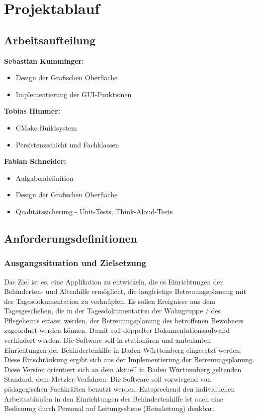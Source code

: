 \section{Projektablauf}

\subsection{Arbeitsaufteilung}
\textbf{Sebastian Kumminger:}
\begin{itemize}
	\item Design der Grafischen Oberfläche
	\item Implementierung der GUI-Funktionen
\end{itemize}
\textbf{Tobias Himmer:}
\begin{itemize}
	\item CMake Buildsystem
	\item Persistenzschicht und Fachklassen
\end{itemize}
\textbf{Fabian Schneider:}
\begin{itemize}
	\item Aufgabendefinition
	\item Design der Grafischen Oberfläche
	\item Qualitätssicherung - Unit-Tests, Think-Aloud-Tests
\end{itemize}

\subsection{Anforderungsdefinitionen}

\subsubsection{Ausgangssituation und Zielsetzung}
\label{subsubsec:ziel}
Das Ziel ist es, eine Applikation zu entwickeln, die es Einrichtungen der Behinderten- und Altenhilfe ermöglicht,
die langfristige Betreuungsplanung mit der Tagesdokumentation zu verknüpfen. Es sollen Ereignisse aus dem Tagesgeschehen,
die in der Tagesdokumentation der Wohngruppe / des Pflegeheims erfasst werden,
der Betreuungsplanung des betroffenen Bewohners zugeordnet werden können.
Damit soll doppelter Dokumentationsaufwand verhindert werden.
Die Software soll in stationären und ambulanten Einrichtungen der Behindertenhilfe in Baden Württemberg eingesetzt werden. 
Diese Einschränkung ergibt sich aus der Implementierung der Betreuungsplanung. Diese Version orientiert sich an dem aktuell in Baden Württemberg
geltenden 
Standard, dem Metzler-Verfahren. 
Die Software soll vorwiegend von pädagogischen Fachkräften benutzt werden. Entsprechend den individuellen Arbeitsabläufen in den 
Einrichtungen der Behindertenhilfe ist auch eine Bedienung durch Personal auf Leitungsebene (Heimleitung) denkbar\cite{Pflichtenheft}.

